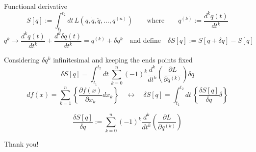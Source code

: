 \documentclass[10pt]{beamer}
\begin{document}
  \begin{frame}{Functional derivative}
    \begin{equation*}
      S[q] := \int_{t_1}^{t_2} dt \,
      L \left(q, \dot{q}, \ddot{q}, \ldots, q^{(n)} \right)
      \qquad \text{where} \qquad q^{(k)} := \frac{d^k q(t)}{dt^k}
    \end{equation*}
    \begin{equation*}
      q^{k} \rightarrow \frac{d^k q(t)}{dt^k} + \frac{d^k \delta q(t)}{dt^k} =
      q^{(k)} + \delta q^{k}
      \quad \text{and define} \quad
      \delta S[q] := S[q + \delta q] - S[q]
    \end{equation*}\vspace{0.2em}

    Considering $\delta q^{k}$ infinitesimal and keeping the ends points fixed
    \begin{equation*}
      \delta S[q] = \int_{t_1}^{t_2} dt \,
      \sum_{k=0}^{n} {(-1)}^k \frac{d^k}{dt^k}
      \left(\frac{\partial L}{\partial q^{(k)}}\right) \delta q
    \end{equation*}
    \begin{equation*}
      df(x) = \sum_{k=1}^{n}
      \left\{\frac{\partial f(x)}{\partial x_k} dx_k\right\}
      \quad \longleftrightarrow \quad
      \delta S[q] = \int_{t_1}^{t_2} dt \,
      \left\{ \frac{\delta S[q]}{\delta q} \delta \right\}
    \end{equation*}

    \alert{
    \begin{equation*}
      \frac{\delta S[q]}{\delta q}:=
      \sum_{k=0}^{n} {(-1)}^k \frac{d^k}{dt^k}
      \left(\frac{\partial L}{\partial q^{(k)}}\right)
    \end{equation*}
    }
  \end{frame}


  \begin{frame}[standout]
    Thank you!
  \end{frame}
\end{document}
